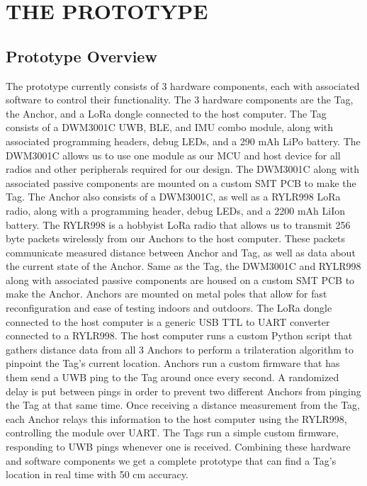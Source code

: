 \documentclass[conference]{IEEEtran}
\begin{document}
\section{THE PROTOTYPE}
\subsection{Prototype Overview}
The prototype currently consists of 3 hardware components, each with 
associated software to control their functionality. The 3 hardware 
components are the Tag, the Anchor, and a LoRa dongle connected to the 
host computer.
The Tag consists of a DWM3001C UWB, BLE, and IMU combo module, along with 
associated programming headers, debug LEDs, and a 290 mAh LiPo battery. 
The DWM3001C allows us to use one module as our MCU and host device for 
all radios and other peripherals required for our design. The DWM3001C 
along with associated passive components are mounted on a custom SMT PCB 
to make the Tag. 
The Anchor also consists of a DWM3001C, as well as a RYLR998 LoRa radio, 
along with a programming header, debug LEDs, and a 2200 mAh LiIon battery. 
The RYLR998 is a hobbyist LoRa radio that allows us to transmit 256 byte 
packets wirelessly from our Anchors to the host computer. These packets 
communicate measured distance between Anchor and Tag, as well as data about 
the current state of the Anchor. Same as the Tag, the DWM3001C and RYLR998 
along with associated passive components are housed on a custom SMT PCB to 
make the Anchor. Anchors are mounted on metal poles that allow for fast 
reconfiguration and ease of testing indoors and outdoors. 
The LoRa dongle connected to the host computer is a generic USB TTL to 
UART converter connected to a RYLR998. The host computer runs a custom 
Python script that gathers distance data from all 3 Anchors to perform a 
trilateration algorithm to pinpoint the Tag’s current location. Anchors 
run a custom firmware that has them send a UWB ping to the Tag around once 
every second. A randomized delay is put between pings in order to prevent 
two different Anchors from pinging the Tag at that same time. Once receiving 
a distance measurement from the Tag, each Anchor relays this information to 
the host computer using the RYLR998, controlling the module over UART. The 
Tags run a simple custom firmware, responding to UWB pings whenever one is 
received. Combining these hardware and software components we get a complete 
prototype that can find a Tag’s location in real time with 50 cm accuracy.
\end{document}
